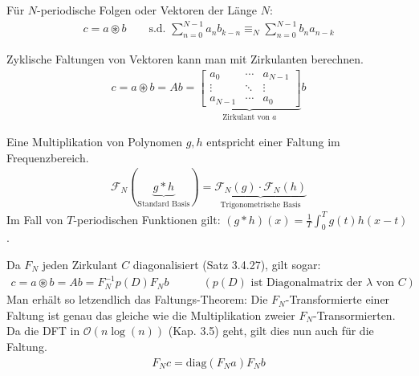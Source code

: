 
 Für $N$-periodische Folgen oder Vektoren der Länge $N$:
\begin{align*}
    c = a \circledast b\quad\quad \text{s.d. } \sum_{n=0}^{N-1} a_nb_{k-n} \equiv_N \sum_{n=0}^{N-1}b_na_{n-k}
\end{align*}

\setcounter{all}{32}
\inlineremark Zyklische Faltungen von Vektoren kann man mit Zirkulanten berechnen. 
\begin{align*}
    c = a \circledast b = Ab = \underbrace{\begin{bmatrix}
        a_0 & \cdots & a_{N-1} \\
        \vdots & \ddots & \vdots \\
        a_{N-1} & \cdots & a_0
    \end{bmatrix}}_{\text{Zirkulant von } a}
    b
\end{align*}


\setcounter{all}{30}
\inlineremark Eine Multiplikation von Polynomen $g,h$ entspricht einer Faltung im Frequenzbereich.
\begin{align*}
    \mathcal{F}_N(\underbrace{g * h}_{\text{Standard Basis}}) = \underbrace{\mathcal{F}_N(g) \cdot \mathcal{F}_N(h)}_{\text{Trigonometrische Basis}}
\end{align*}
Im Fall von $T$-periodischen Funktionen gilt: $(g * h)(x) = \frac{1}{T}\displaystyle\int_{0}^{T}g(t)h(x-t)$.

\inlineremark Da $F_N$ jeden Zirkulant $C$ diagonalisiert (Satz 3.4.27), gilt sogar:
\begin{align*}
    c = a \circledast b = Ab = F_N^{-1}p(D)F_Nb \quad \quad \quad (p(D) \text{ ist Diagonalmatrix der } \lambda \text{ von } C )
\end{align*}
Man erhält so letzendlich das Faltungs-Theorem: Die $F_N$-Transformierte einer Faltung ist genau das gleiche wie die Multiplikation zweier $F_N$-Transormierten. Da die DFT in $\mathcal{O}(n\log(n))$ (Kap. 3.5) geht, gilt dies nun auch für die Faltung.
\begin{align*}
    F_Nc = \text{diag}(F_N a) F_N b
\end{align*}